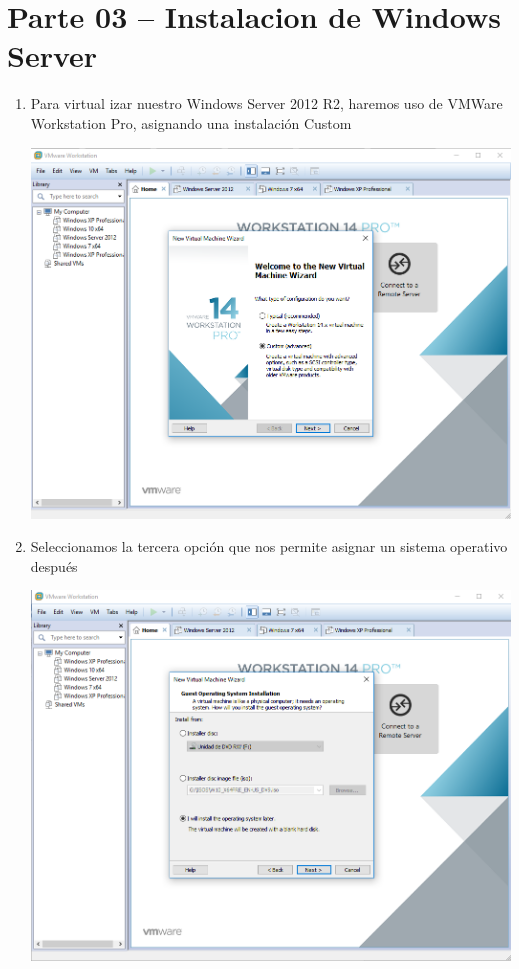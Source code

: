 \section{Parte 03 – Instalacion de Windows Server} 

\begin{enumerate}[1.]
	\item Para virtual izar nuestro Windows Server 2012 R2, haremos uso de VMWare Workstation Pro, asignando una instalación Custom

	\begin{center}
	\includegraphics[width=15cm]{./Imagenes/img1server} 
	\end{center}
	
	\item Seleccionamos la tercera opción que nos permite asignar un sistema operativo después

	\begin{center}
	\includegraphics[width=15cm]{./Imagenes/img2server} 
	\end{center}



\end{enumerate}
